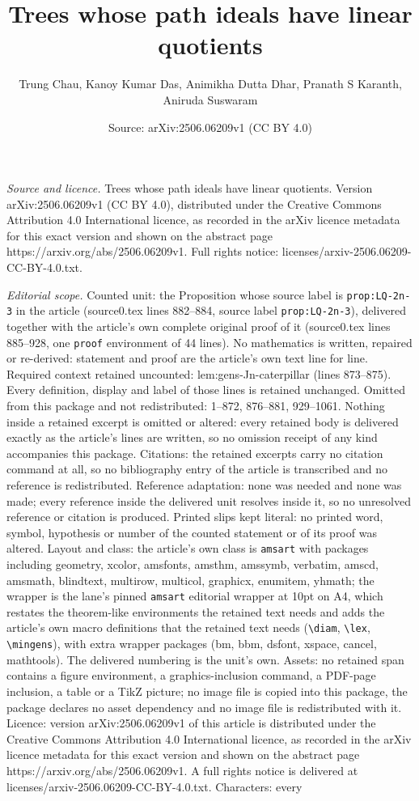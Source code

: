 \documentclass[10pt,a4paper]{amsart}
\title[Trees whose path ideals have linear quotients]{Trees whose path ideals have linear quotients}
\author{Trung Chau, Kanoy Kumar Das, Animikha Dutta Dhar, Pranath S Karanth, Aniruda Suswaram}
\date{Source: arXiv:2506.06209v1 (CC BY 4.0)}
\begin{document}
\maketitle

\noindent\emph{Source and licence.} Trees whose path ideals have linear quotients. Version arXiv:2506.06209v1 (CC BY 4.0), distributed under the Creative Commons Attribution 4.0 International licence, as recorded in the arXiv licence metadata for this exact version and shown on the abstract page https://arxiv.org/abs/2506.06209v1. Full rights notice: licenses/arxiv-2506.06209-CC-BY-4.0.txt.\par\smallskip

\noindent\textit{Editorial scope.} Counted unit: the Proposition whose source label is \texttt{prop:LQ-2n-3} in the article (source0.tex lines 882--884, source label \texttt{prop:LQ-2n-3}), delivered together with the article's own complete original proof of it (source0.tex lines 885--928, one \texttt{proof} environment of 44 lines). No mathematics is written, repaired or re-derived: statement and proof are the article's own text line for line. Required context retained uncounted: lem:gens-Jn-caterpillar (lines 873--875). Every definition, display and label of those lines is retained unchanged. Omitted from this package and not redistributed: 1--872, 876--881, 929--1061. Nothing inside a retained excerpt is omitted or altered: every retained body is delivered exactly as the article's lines are written, so no omission receipt of any kind accompanies this package. Citations: the retained excerpts carry no citation command at all, so no bibliography entry of the article is transcribed and no reference is redistributed. Reference adaptation: none was needed and none was made; every reference inside the delivered unit resolves inside it, so no unresolved reference or citation is produced. Printed slips kept literal: no printed word, symbol, hypothesis or number of the counted statement or of its proof was altered. Layout and class: the article's own class is \texttt{amsart} with packages including geometry, xcolor, amsfonts, amsthm, amssymb, verbatim, amscd, amsmath, blindtext, multirow, multicol, graphicx, enumitem, yhmath; the wrapper is the lane's pinned \texttt{amsart} editorial wrapper at 10pt on A4, which restates the theorem-like environments the retained text needs and adds the article's own macro definitions that the retained text needs (\texttt{\textbackslash diam}, \texttt{\textbackslash lex}, \texttt{\textbackslash mingens}), with extra wrapper packages (bm, bbm, dsfont, xspace, cancel, mathtools). The delivered numbering is the unit's own. Assets: no retained span contains a figure environment, a graphics-inclusion command, a PDF-page inclusion, a table or a TikZ picture; no image file is copied into this package, the package declares no asset dependency and no image file is redistributed with it. Licence: version arXiv:2506.06209v1 of this article is distributed under the Creative Commons Attribution 4.0 International licence, as recorded in the arXiv licence metadata for this exact version and shown on the abstract page https://arxiv.org/abs/2506.06209v1. A full rights notice is delivered at licenses/arxiv-2506.06209-CC-BY-4.0.txt. Characters: every 
\end{document}
